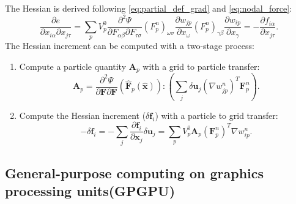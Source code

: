 \documentclass[m,times]{cgMA}
\begin{document}
The Hessian is derived following \ref{eq:partial_def_grad} and \ref{eq:nodal_force}:
\begin{equation}
  \frac{\partial e}{\partial {x}_{i\alpha} \partial x_{j\tau}}
= \sum_p V^0_p\frac { \partial ^ { 2 } \Psi } { \partial  { F}_{\alpha \beta} \partial { F } _{\tau \sigma}}  (F^n_p)_{\omega \sigma}\frac{\partial w_{jp}}{\partial x_\omega} (F^n_p)_{\gamma\beta}\frac{\partial w_{ip}}{\partial x_\gamma} = -\frac{\partial {f}_{i\alpha}}{\partial x_{j\tau}}.
\end{equation}
The Hessian increment can be computed with a two-stage process:
\begin{enumerate}
  \item Compute a particle quantity $\boldsymbol{A}_p$ with a grid to particle transfer:
    \begin{equation}
    \boldsymbol{A}_p = \frac { \partial ^ { 2 } \Psi } { \partial \boldsymbol { F } \partial \boldsymbol { F } } ( \hat { \boldsymbol { F } } _ { p } ( \hat { \boldsymbol { x } } )) : \left(\sum_j \delta \boldsymbol{u}_j (\nabla w_{jp}^n)^T \boldsymbol{F}^n_p\right).
    \end{equation}
  \item Compute the Hessian increment ($\delta \boldsymbol{f}_i$) with a particle to grid transfer:
\begin{equation}
  - \delta \boldsymbol{f}_i = - \sum_j \frac{\partial \boldsymbol{f}_i}{\partial \boldsymbol{x}_j} \delta \boldsymbol{u}_j = \sum_p V_p^0 \boldsymbol{A}_p(\boldsymbol{F}^n_p)^T \nabla w_{ip}^n.
\end{equation}
\end{enumerate}
\subsection{General-purpose computing on graphics processing units(GPGPU)}
\end{document}
